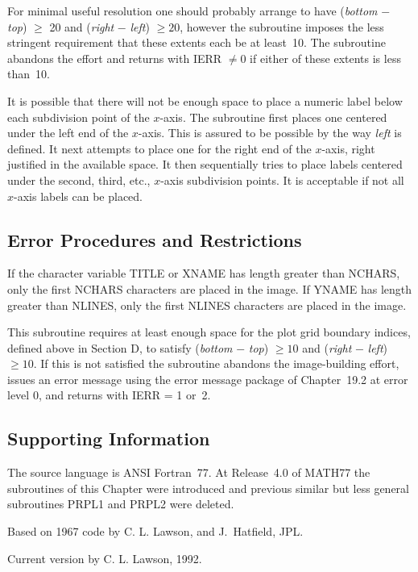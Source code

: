 \documentclass[twoside]{MATH77}
\begin{document}
For minimal useful resolution one should probably arrange to have
({\em bottom} $-$ {\em top}) $\geq $ 20 and ({\em right} $-$ {\em left})
$\geq 20$, however the subroutine imposes the less stringent requirement
that these extents each be at least~10. The subroutine abandons the effort
and returns with IERR $\neq 0$ if either of these extents is less than~10.

It is possible that there will not be enough space to place a numeric label
below each subdivision point of the $x$-axis. The subroutine first places
one centered under the left end of the $x$-axis. This is assured to be
possible by the way {\em left} is defined. It next attempts to place one for
the right end of the $x$-axis, right justified in the available space. It then
sequentially tries to place labels centered under the second, third,
etc., $x$-axis subdivision points. It is acceptable if not all $x$-axis labels
can be placed.

\subsection{Error Procedures and Restrictions}

If the character variable TITLE or XNAME has length greater than NCHARS,
only the first NCHARS characters are placed in the image. If YNAME has
length greater than NLINES, only the first NLINES characters are placed in
the image.

This subroutine requires at least enough space for the plot grid boundary
indices, defined above in Section D, to satisfy ({\em bottom} $-$
{\em top}) $\geq 10$ and ({\em right} $-$ {\em left}) $\geq 10$. If this is not
satisfied the subroutine abandons the image-building effort, issues an error
message using the error message package of Chapter~19.2 at error
level 0, and returns with IERR = 1 or~2.

\subsection{Supporting Information}

The source language is ANSI Fortran~77.  At Release~4.0 of MATH77 the
subroutines of this Chapter were introduced and previous similar but
less general subroutines PRPL1 and PRPL2 were deleted.

Based on 1967 code by C. L. Lawson, and J.\ Hatfield, JPL.

Current version by C. L. Lawson, 1992.

\pagebreak
\end{document}
